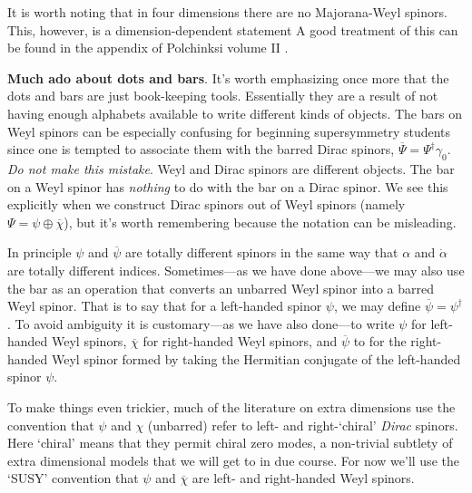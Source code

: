\documentclass[12pt]{article}
\numberwithin{equation}{section}    %
\begin{document}
It is worth noting that in four dimensions there are no Majorana-Weyl spinors. This, however, is a dimension-dependent statement A good treatment of this can be found in the appendix of Polchinksi volume II \cite{Polchinski:1998rr}.

\vspace{.5em}
\begin{framed}
	\noindent\textbf{Much ado about dots and bars}. It's worth emphasizing once more that the dots and bars are just book-keeping tools. Essentially they are a result of not having enough alphabets available to write different kinds of objects. The bars on Weyl spinors can be especially confusing for beginning supersymmetry students since one is tempted to associate them with the barred Dirac spinors, $\overline\Psi = \Psi^\dagger \gamma_0$. \emph{Do not make this mistake}. Weyl and Dirac spinors are different objects. The bar on a Weyl spinor has \emph{nothing} to do with the bar on a Dirac spinor. We see this explicitly when we construct Dirac spinors out of Weyl spinors (namely $\Psi = \psi\oplus\overline\chi$), but it's worth remembering because the notation can be misleading. %
	\vspace{.5em}

\noindent In principle $\psi$ and $\overline\psi$ are totally different spinors in the same way that $\alpha$ and $\dot\alpha$ are totally different indices. Sometimes---as we have done above---we may also use the bar as an operation that converts an unbarred Weyl spinor into a barred Weyl spinor. That is to say that for a left-handed spinor $\psi$, we may define $\overline\psi=\psi^\dag$. To avoid ambiguity it is customary---as we have also done---to write $\psi$ for left-handed Weyl spinors, $\overline\chi$ for right-handed Weyl spinors, and $\overline\psi$ to for the right-handed Weyl spinor formed by taking the Hermitian conjugate of the left-handed spinor $\psi$.
\vspace{.5em}
	
	
	\noindent To make things even trickier, much of the literature on extra dimensions use the convention that $\psi$ and $\chi$ (unbarred) refer to left- and right-`chiral' \textit{Dirac} spinors. Here `chiral' means that they permit chiral zero modes, a non-trivial subtlety of extra dimensional models that we will get to in due course. For now we'll use the `SUSY' convention that $\psi$ and $\overline\chi$ are left- and right-handed Weyl spinors.
\end{framed}
\vspace{.5em}
\end{document}
